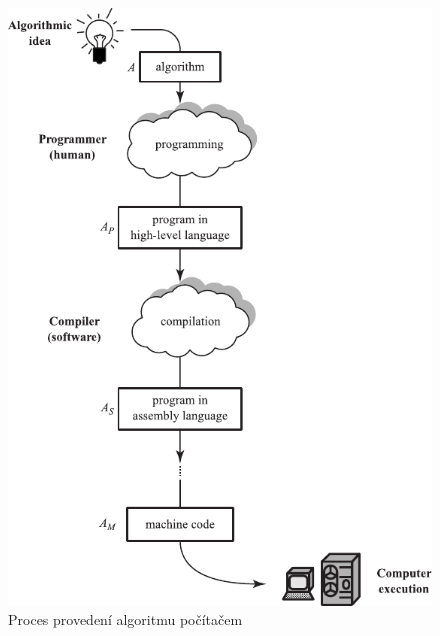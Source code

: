 \documentclass[FP,DP]{tulthesis}
\begin{document}
\begin{figure}
    \centering
    \includegraphics{programming.pdf}
\caption{Proces provedení algoritmu počítačem \citep[s.~56]{spirit}} \label{provedeni}
\end{figure}

\end{document}
